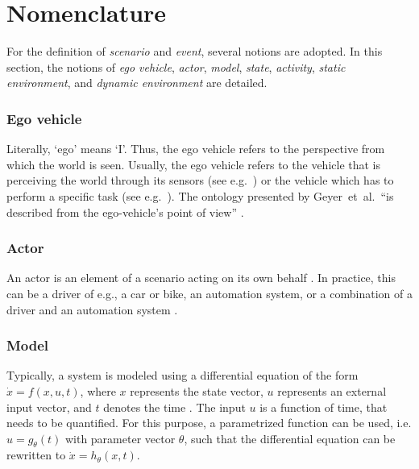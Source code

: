 \section{Nomenclature}
\label{sec:nomenclature}

For the definition of \emph{scenario} and \emph{event}, several notions are adopted. In this section, the notions of \emph{ego vehicle}, \emph{actor}, \emph{model}, \emph{state}, \emph{activity}, \emph{static environment}, and \emph{dynamic environment} are detailed. 

\subsubsection{Ego vehicle}
\label{sec:ego vehicle}
Literally, `ego' means `I'. Thus, the ego vehicle refers to the perspective from which the world is seen. Usually, the ego vehicle refers to the vehicle that is perceiving the world through its sensors (see e.g.~\cite{Bonnin2014}) or the vehicle which has to perform a specific task (see e.g.~\cite{althoff2017CommonRoad}). The ontology presented by Geyer~et~al.\ ``is described from the ego-vehicle's point of view'' \cite{geyer2014}.  

\subsubsection{Actor}
\label{sec:actor}
An actor is an element of a scenario acting on its own behalf \cite{ulbrich2015}. In practice, this can be a driver of e.g., a car or bike, an automation system, or a combination of a driver and an automation system \cite{geyer2014}.

\subsubsection{Model}
\label{sec:model}
Typically, a system is modeled using a differential equation of the form $\dot{x}=f(x,u,t)$, where $x$ represents the state vector, $u$ represents an external input vector, and $t$ denotes the time \cite{norman2011control}. The input $u$ is a function of time, that needs to be quantified. For this purpose, a parametrized function can be used, i.e. $u=g_{\theta}(t)$ with parameter vector $\theta$, such that the differential equation can be rewritten to $\dot{x}=h_{\theta}(x,t)$.

